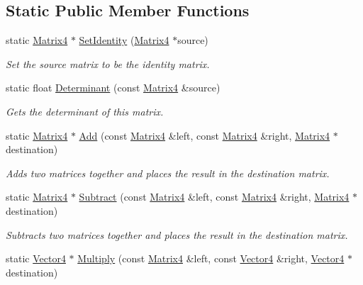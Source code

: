 \subsection*{Static Public Member Functions}
\begin{DoxyCompactItemize}
\item 
static \hyperlink{class_flounder_1_1_matrix4}{Matrix4} $\ast$ \hyperlink{class_flounder_1_1_matrix4_aead2d9bd0456a16cf90f3c84962ff65b}{Set\+Identity} (\hyperlink{class_flounder_1_1_matrix4}{Matrix4} $\ast$source)
\begin{DoxyCompactList}\small\item\em Set the source matrix to be the identity matrix. \end{DoxyCompactList}\item 
static float \hyperlink{class_flounder_1_1_matrix4_a9894f9d622352edae819a37680426a10}{Determinant} (const \hyperlink{class_flounder_1_1_matrix4}{Matrix4} \&source)
\begin{DoxyCompactList}\small\item\em Gets the determinant of this matrix. \end{DoxyCompactList}\item 
static \hyperlink{class_flounder_1_1_matrix4}{Matrix4} $\ast$ \hyperlink{class_flounder_1_1_matrix4_a272ae0d868f7e9f1ecfbd389ccfd3aef}{Add} (const \hyperlink{class_flounder_1_1_matrix4}{Matrix4} \&left, const \hyperlink{class_flounder_1_1_matrix4}{Matrix4} \&right, \hyperlink{class_flounder_1_1_matrix4}{Matrix4} $\ast$destination)
\begin{DoxyCompactList}\small\item\em Adds two matrices together and places the result in the destination matrix. \end{DoxyCompactList}\item 
static \hyperlink{class_flounder_1_1_matrix4}{Matrix4} $\ast$ \hyperlink{class_flounder_1_1_matrix4_a2a6916d0c3baea67ac8f1cf88f4b2c4e}{Subtract} (const \hyperlink{class_flounder_1_1_matrix4}{Matrix4} \&left, const \hyperlink{class_flounder_1_1_matrix4}{Matrix4} \&right, \hyperlink{class_flounder_1_1_matrix4}{Matrix4} $\ast$destination)
\begin{DoxyCompactList}\small\item\em Subtracts two matrices together and places the result in the destination matrix. \end{DoxyCompactList}\item 
static \hyperlink{class_flounder_1_1_vector4}{Vector4} $\ast$ \hyperlink{class_flounder_1_1_matrix4_a915ecbaedf757e12c1592b9e1ed0657f}{Multiply} (const \hyperlink{class_flounder_1_1_matrix4}{Matrix4} \&left, const \hyperlink{class_flounder_1_1_vector4}{Vector4} \&right, \hyperlink{class_flounder_1_1_vector4}{Vector4} $\ast$destination)

\end{DoxyCompactItemize}
